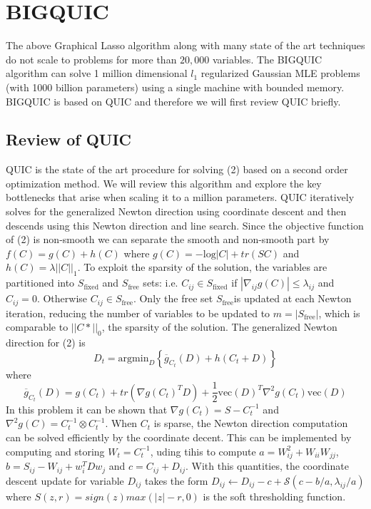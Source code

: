 \documentclass[12pt]{article}
\begin{document}
\section{BIGQUIC}
The above Graphical Lasso algorithm along with many state of the art techniques do not scale to problems for more than $20,000$ variables. The BIGQUIC algorithm\cite{hsieh2013big} can solve 1 million dimensional $l_1$ regularized Gaussian MLE problems (with 1000 billion parameters) using a single machine with bounded memory. BIGQUIC is based on QUIC and therefore we will first review QUIC briefly.
\subsection{Review of QUIC} 
QUIC is the state of the art procedure for solving (2) based on a second order optimization method. We will review this algorithm and explore the key bottlenecks that arise when scaling it to a million parameters\cite{hsieh2013big}.
QUIC iteratively solves for the generalized Newton direction using coordinate descent and then descends using this Newton direction and line search. Since the objective function of (2) is non-smooth we can separate the smooth and non-smooth part by $f(C)=g(C)+h(C)$ where $g(C)=-\text{log}|C|+tr(SC)$ and $h(C)=\lambda||C||_1$. To exploit the sparsity of the solution, the variables are partitioned into $S_{\text{fixed}}$ and $S_{\text{free}}$ sets: i.e. $C_{ij}\in S_{\text{fixed}}$ if $|\nabla_{ij}g(C)|\leq\lambda_{ij}$ and $C_{ij}=0$. Otherwise $C_{ij}\in S_{\text{free}}$. Only the free set $S_{\text{free}}$is updated at each Newton iteration, reducing the number of variables to be updated to $m=|S_{\text{free}}|$, which is comparable to $||C*||_0$, the sparsity of the solution.
The generalized Newton direction for (2) is \[D_t=\text{argmin}_D\left\{\overline{g}_{C_t}(D)+h(C_t+D)\right\}\]
where \[\overline{g}_{C_t}(D)=g(C_t)+tr(\nabla g(C_t)^TD)+\dfrac{1}{2}\text{vec}(D)^T\nabla^2g(C_t)\text{vec}(D)\]
In this problem it can be shown that $\nabla g(C_t)=S-C_{t}^{-1}$ and $\nabla^2g(C)=C_{t}^{-1}\otimes C_{t}^{-1}$. When $C_t$ is sparse, the Newton direction computation can be solved efficiently by the coordinate decent. This can be implemented by computing and storing $W_t=C_t^{-1}$, uding tihis to compute $a=W_{ij}^2+W_{ii}W_{jj}$, $b=S_{ij}-W_{ij}+w_i^TDw_j$ and $c=C_{ij}+D_{ij}$. With this quantities, the coordinate descent update for variable $D_{ij}$ takes the form $D_{ij}\leftarrow D_{ij}-c+\mathcal{S}(c-b/a,\lambda_{ij}/a)$ where $S(z,r)=sign(z)max(|z|-r,0)$ is the soft thresholding function.
\end{document}
